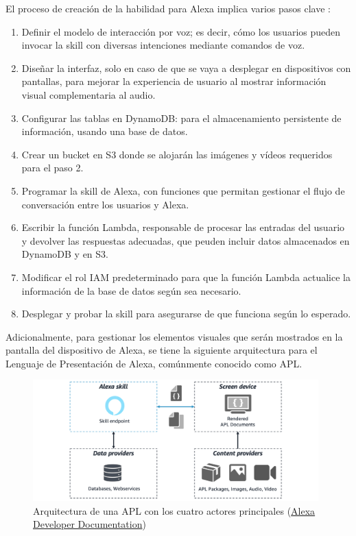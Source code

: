 El proceso de creación de la habilidad para Alexa implica varios pasos clave \parencite{arquitecturaSkill}:
\begin{enumerate}
	\item Definir el modelo de interacción por voz; es decir, cómo los usuarios pueden invocar la skill con diversas intenciones mediante comandos de voz.
	\item Diseñar la interfaz, solo en caso de que se vaya a desplegar en dispositivos con pantallas, para mejorar la experiencia de usuario al mostrar información visual complementaria al audio.
	\item Configurar las tablas en DynamoDB: para el almacenamiento persistente de información, usando una base de datos.
	\item Crear un bucket en S3 donde se alojarán las imágenes y vídeos requeridos para el paso 2.
	\item Programar la skill de Alexa, con funciones que permitan gestionar el flujo de conversación entre los usuarios y Alexa.
	\item Escribir la función Lambda, responsable de procesar las entradas del usuario y devolver las respuestas adecuadas, que peuden incluir datos almacenados en DynamoDB y en S3.
	\item Modificar el rol IAM predeterminado para que la función Lambda actualice la información de la base de datos según sea necesario.
	\item Desplegar y probar la skill para asegurarse de que funciona según lo esperado.
\end{enumerate}

Adicionalmente, para gestionar los elementos visuales que serán mostrados en la pantalla del dispositivo de Alexa, se tiene la siguiente arquitectura para el Lenguaje de Presentación de Alexa, comúnmente conocido como APL.

\begin{figure}[H]
	\centering
	\includegraphics[width=0.98\textwidth]{imgs/arquitectura-apl.png}
	\caption{Arquitectura de una APL con los cuatro actores principales (\href{https://developer.amazon.com/en-US/docs/alexa/alexa-presentation-language/apl-bp-understand-apl-architecture.html}{Alexa Developer Documentation})}
\label{fig:arquitectura-apl}
\end{figure}

